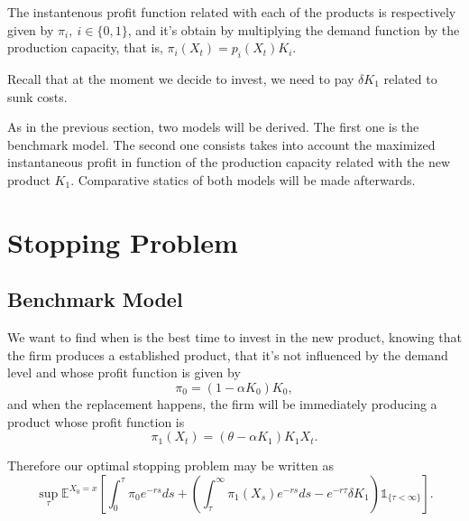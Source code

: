 The instantenous profit function related with each of the products is respectively given by $\pi_i, \ i \in \{0,1\}$, and it's obtain by multiplying the demand function by the production capacity, that is, $\pi_i(X_t)=p_i(X_t) K_i$.

Recall that at the moment we decide to invest, we need to pay $\delta K_1$ related to sunk costs. 


As in the previous section, two models will be derived. The first one is the benchmark model. The second one consists takes into account the maximized instantaneous profit in function of the production capacity related with the new product $K_1$. Comparative statics of both models will be made afterwards.



\section{Stopping Problem}
\label{section:2_theory}



\subsection{Benchmark Model}
\label{subsec:2_bm}

We want to find when is the best time to invest in the new product, knowing that the firm produces a established product, that it's not influenced by the demand level and whose profit function is given by 
\begin{equation}
\pi_0=(1-\alpha K_0)K_0,
\label{pi0}
\end{equation}
and when the replacement happens, the firm will be immediately producing a product whose profit function is 
\begin{equation}
\pi_1(X_t) =(\theta-\alpha K_1)K_1 X_t.
\label{pi1}
\end{equation}

Therefore our optimal stopping problem may be written as
\begin{equation}
\sup _\tau \mathds{E}^{X_0=x} \left[  \int_0^\tau \pi_0e^{-rs} ds +  \left( \int_\tau^\infty \pi_1(X_s)e^{-rs}ds -e^{-r\tau}\delta K_1 \right) \mathds{1}_{\{ \tau < \infty \}} \right].
\label{eq:prob2}
\end{equation}

